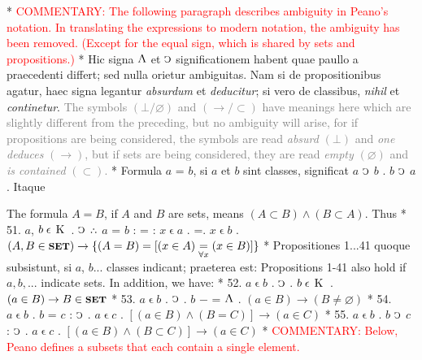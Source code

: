\documentclass{book}
\newcommand{\C}{\mathop{\sbox0{$\displaystyle$$\reflectbox{C}$} %
\raisebox{-\height+\ht0-0.05cm}[\ht0][\dp0]{\scalebox{0.8}[0.8]{\copy0}}}\displaylimits} %
\newcommand{\pppNoSpace}{\leavevmode\lower0ex\hbox{.}\kern-0.1em\raise0.7ex\hbox{.}\kern-0.1em\lower0ex\hbox{.}} %
\newcommand{\abs}{\mathop{\rotatebox[origin=c]{180}{V}}}
\newcommand{\smallIn}{\ensuremath{\mathrel{\epsilon}}}
\newcommand{\K}{\mathop{\thinspace \text{K} \thinspace}}
\newcommand{\setOfSets}{\mathord{\text{{\footnotesize \textbf{SET}}}}}
\newcommand\irrelavent[1]{\textcolor{gray}{#1}}
\newcommand\commentary[1]{\textcolor{red}{COMMENTARY: #1}}
\newenvironment{translateTwoCol}
               { %
                 \columnratio{0.5, 0.5} \begin{paracol}{2}
                 \newcommand{\LAT}{\switchcolumn[0]*}
                 \newcommand{\ENG}{\switchcolumn[1]}
               }
               { %
                 \let\ENG\undefined
                 \let\LAT\undefined
                 \end{paracol}
               }
\begin{document}
\begin{translateTwoCol}
\LAT
\ENG
\commentary{The following paragraph describes ambiguity in Peano's notation.  In translating the expressions to modern notation, the ambiguity has been removed.  (Except for the equal sign, which is shared by sets and propositions.) }
\LAT
Hic signa $\abs$ et $\C$ significationem habent quae paullo a praecedenti differt; sed nulla orietur ambiguitas. Nam si de propositionibus agatur, haec signa legantur \emph{absurdum} et \emph{deducitur}; si vero de classibus, \emph{nihil} et \emph{continetur}.
\ENG
\irrelavent{The symbols $(\bot / \varnothing)$ and $(\rightarrow / \subset)$ have meanings here which are slightly different from the preceding, but no ambiguity will arise, for if propositions are being considered, the symbols are read \emph{absurd} $(\bot)$ and \emph{one deduces} $(\rightarrow)$, but if sets are being considered, they are read \emph{empty} $(\varnothing)$ and \emph{is contained} $(\subset)$.}
\LAT
\quad Formula $a$ = $b$, si $a$ et $b$ sint classes, significat $a$ $\C$ $b$ . $b$ $\C$ $a$. Itaque
\ENG
\raggedright
\quad The formula $A = B$, if $A$ and $B$ are sets, means $(A \subset B) \wedge (B \subset A)$. Thus
\LAT
51. \hspace{0.67cm} $a$, $b \smallIn \K$ . $\C$ $\pppNoSpace$ $a$ = $b$ : = : $x \smallIn a$ . =\scalebox{0.7}{$x$}\thinspace . $x \smallIn b$
\ENG
51. \hspace{0.67cm} $(A, B \in \setOfSets) \rightarrow \{(A = B) = [(x \in A) \underset{\forall x}=  (x \in B)]\}$
\LAT
Propositiones 1...41 quoque subsistunt, si $a$, $b$... classes indicant; praeterea est:
\ENG
Propositions 1-41 also hold if $a,b,...$ indicate sets. In addition, we have:
\LAT
52. \hspace{0.67cm} $a\smallIn b$ . $\C$ . $b \smallIn \K$
\ENG
52. \hspace{0.67cm} $(a \in B) \rightarrow B \in \setOfSets$
\LAT
53. \hspace{0.67cm} $a\smallIn b$ . $\C$ . $b$ $-$ = $\abs$
\ENG
53. \hspace{0.67cm} $(a \in B) \rightarrow (B \not= \varnothing)$
\LAT
54. \hspace{0.67cm} $a \smallIn b$ . $b$ = $c$ : $\C$ . $a \smallIn c$
\ENG
54. \hspace{0.67cm} $[(a \in B) \wedge (B = C)] \rightarrow (a \in C)$
\LAT
55. \hspace{0.67cm} $a \smallIn b$ . $b$ $\C$ $c$ : $\C$ . $a \smallIn c$
\ENG
55. \hspace{0.67cm} $[(a \in B) \wedge (B \subset C)] \rightarrow (a \in C)$
\LAT
\ENG
\commentary{Below, Peano defines a subsets that each contain a single element.}

\end{translateTwoCol}
\end{document}
